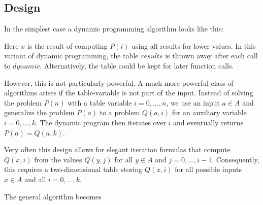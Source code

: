 \subsection{Design}

In the simplest case a dynamic programming algorithm looks like this:

\begin{acode}
\end{acode}

Here $x$ is the result of computing $P(i)$ using all results for lower values.
In this variant of dynamic programming, the table $results$ is thrown away after each call to $dynamic$.
Alternatively, the table could be kept for later function calls.

However, this is not particularly powerful.
A much more powerful class of algorithms arises if the table-variable is not part of the input.
Instead of solving the problem $P(n)$ with a table variable $i=0,\ldots,n$, we use an input $a\in A$ and generalize the problem $P(a)$ to a problem $Q(a,i)$ for an auxiliary variable $i=0,\ldots, k$.
The dynamic program then iterates over $i$ and eventually returns $P(a)=Q(a,k)$.

Very often this design allows for elegant iteration formulas that compute $Q(x,i)$ from the values $Q(y,j)$ for all $y\in A$ and $j=0,\ldots,i-1$.
Consequently, this requires a two-dimensional table storing $Q(x,i)$ for all possible inputs $x\in A$ and all $i=0,\ldots, k$.

The general algorithm becomes
\begin{acode}
\end{acode}

